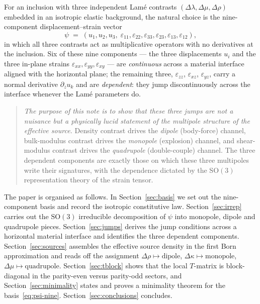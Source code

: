 \documentclass[11pt,a4paper]{article}
\newcommand{\eps}{\varepsilon}
\theoremstyle{plain}
\theoremstyle{definition}
\theoremstyle{remark}
\begin{document}
For an inclusion with three independent Lam\'e contrasts
$(\Delta\lambda,\Delta\mu,\Delta\rho)$ embedded in an isotropic elastic
background, the natural choice is the nine-component
displacement--strain vector
\begin{equation}
  \psi
  \;=\;
  (u_1,u_2,u_3,\;\eps_{11},\eps_{22},\eps_{33},
         \eps_{23},\eps_{13},\eps_{12}),
  \label{eq:psi-nine}
\end{equation}
in which all three contrasts act as multiplicative operators with no
derivatives at the inclusion.  Six of these nine components --- the three
displacements $u_i$ and the three in-plane strains
$\eps_{xx},\eps_{yy},\eps_{xy}$ --- are \emph{continuous} across a
material interface aligned with the horizontal plane; the remaining
three, $\eps_{zz}$, $\eps_{xz}$, $\eps_{yz}$, carry a normal derivative
$\partial_z u_k$ and are \emph{dependent}: they jump discontinuously
across the interface whenever the Lam\'e parameters do.

\begin{quote}
\textit{The purpose of this note is to show that these three jumps are
not a nuisance but a physically lucid statement of the multipole
structure of the effective source.}  Density contrast drives the
\emph{dipole} (body-force) channel, bulk-modulus contrast drives the
\emph{monopole} (explosion) channel, and shear-modulus contrast drives
the \emph{quadrupole} (double-couple) channel.  The three dependent
components are exactly those on which these three multipoles write their
signatures, with the dependence dictated by the $\mathrm{SO}(3)$
representation theory of the strain tensor.
\end{quote}

\medskip
\noindent
The paper is organised as follows.  In Section~\ref{sec:basis} we set
out the nine-component basis and record the isotropic constitutive law.
Section~\ref{sec:irrep} carries out the $\mathrm{SO}(3)$ irreducible
decomposition of $\psi$ into monopole, dipole and quadrupole pieces.
Section~\ref{sec:jumps} derives the jump conditions across a horizontal
material interface and identifies the three dependent components.
Section~\ref{sec:sources} assembles the effective source density in the
first Born approximation and reads off the assignment
$\Delta\rho\mapsto\text{dipole}$, $\Delta\kappa\mapsto\text{monopole}$,
$\Delta\mu\mapsto\text{quadrupole}$.  Section~\ref{sec:tblock} shows
that the local $T$-matrix is block-diagonal in the parity-even versus
parity-odd sectors, and Section~\ref{sec:minimality} states and proves
a minimality theorem for the basis~\eqref{eq:psi-nine}.
Section~\ref{sec:conclusions} concludes.
\end{document}

